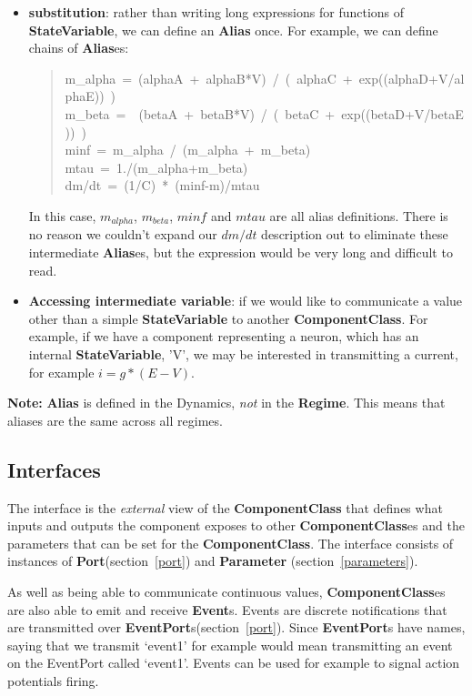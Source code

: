 \documentclass{article}
\newcommand{\note}[1]{%
\begin{center}
\colorbox{issuecolor}{\parbox{0.8\linewidth}{\textbf{Note:} #1}}
\end{center}%
}
\newcommand{\ComponentClass}{{\bf{ComponentClass}}\xspace}
\newcommand{\ComponentClasses}{{\bf{ComponentClass}}es\xspace}
\newcommand{\StateVariable}{{\bf{StateVariable}}\xspace}
\newcommand{\Alias}{{\bf{Alias}}\xspace}
\newcommand{\Aliases}{{\bf{Alias}}es\xspace}
\newcommand{\EventPorts}{{\bf{EventPort}}s\xspace}
\newcommand{\Port}{{\bf{Port}}\xspace}
\newcommand{\Events}{{\bf{Event}}s\xspace}
\newcommand{\Regime}{{\bf{Regime}}\xspace}
\newcommand{\Parameter}{{\bf{Parameter}}\xspace}
\begin{document}
\begin{itemize}
\item {\bf substitution}: rather than writing long expressions for functions of \StateVariable,
we can define an \Alias once. For example, we can define chains of
\Aliases:
%
\begin{quote}{\ttfamily \raggedright \noindent
m\_alpha~=~(alphaA~+~alphaB*V)~/~(~alphaC~+~exp((alphaD+V/alphaE))~)\\
m\_beta~=~~(betaA~+~betaB*V)~/~(~betaC~+~exp((betaD+V/betaE))~)\\
minf~=~m\_alpha~/~(m\_alpha~+~m\_beta)\\
mtau~=~1./(m\_alpha+m\_beta)\\
dm/dt~=~(1/C)~*~(minf-m)/mtau
}
\end{quote}

In this case, $m_{alpha}$, $m_{beta}$, $minf$ and $mtau$ are all
alias definitions. There is no reason we couldn't expand our $dm/dt$
description out to eliminate these intermediate \Aliases, but the expression
would be very long and difficult to read.

\item {\bf Accessing intermediate variable}: if we would like to communicate a value other than a simple \StateVariable to another \ComponentClass. For example, if we have a component representing a
neuron, which has an internal \StateVariable, 'V', we may be interested in
transmitting a current, for example $i=g*(E-V)$.

\end{itemize}

\note{\Alias is defined in the Dynamics, \emph{not} in the
\Regime. This means that aliases are the same across all regimes.}

\subsection{Interfaces}

The interface is the \emph{external} view of the \ComponentClass that defines
what inputs and outputs the component exposes to other \ComponentClasses and the
parameters that can be set for the \ComponentClass. The interface consists of
instances of \Port (section~\ref{port}) and \Parameter
(section~\ref{parameters}).

As well as being able to communicate continuous values, \ComponentClasses are also
able to emit and receive \Events. Events are discrete notifications
that are transmitted over \EventPorts (section~\ref{port}). Since
\EventPorts have names, saying that we transmit `event1' for example
would mean transmitting an event on the EventPort called `event1'. Events
can be used for example to signal action potentials firing.
\end{document}
